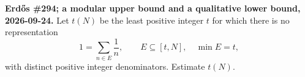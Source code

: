 \textbf{Erd\H{o}s \#294; a modular upper bound and a qualitative lower bound, 2026-09-24.}
Let $t(N)$ be the least positive integer $t$ for which there is no representation
\[
1=\sum_{n\in E}\frac1n,\qquad E\subseteq[t,N],\quad \min E=t,
\]
with distinct positive integer denominators. Estimate $t(N)$.
